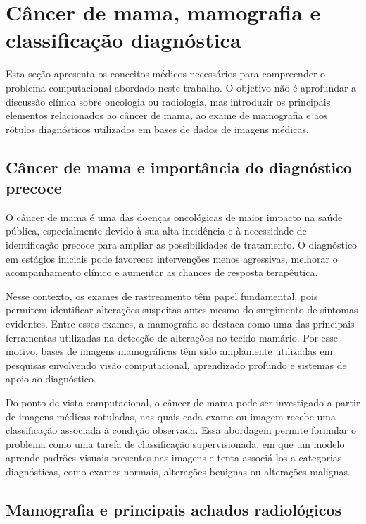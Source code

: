 \documentclass[
    12pt,
    openright,
    oneside,
    a4paper,
    english,
    brazil
]{abntex2}
\begin{document}
\section{Câncer de mama, mamografia e classificação diagnóstica}

Esta seção apresenta os conceitos médicos necessários para compreender o problema computacional abordado neste trabalho. O objetivo não é aprofundar a discussão clínica sobre oncologia ou radiologia, mas introduzir os principais elementos relacionados ao câncer de mama, ao exame de mamografia e aos rótulos diagnósticos utilizados em bases de dados de imagens médicas.

\subsection{Câncer de mama e importância do diagnóstico precoce}

O câncer de mama é uma das doenças oncológicas de maior impacto na saúde pública, especialmente devido à sua alta incidência e à necessidade de identificação precoce para ampliar as possibilidades de tratamento. O diagnóstico em estágios iniciais pode favorecer intervenções menos agressivas, melhorar o acompanhamento clínico e aumentar as chances de resposta terapêutica.

Nesse contexto, os exames de rastreamento têm papel fundamental, pois permitem identificar alterações suspeitas antes mesmo do surgimento de sintomas evidentes. Entre esses exames, a mamografia se destaca como uma das principais ferramentas utilizadas na detecção de alterações no tecido mamário. Por esse motivo, bases de imagens mamográficas têm sido amplamente utilizadas em pesquisas envolvendo visão computacional, aprendizado profundo e sistemas de apoio ao diagnóstico.

Do ponto de vista computacional, o câncer de mama pode ser investigado a partir de imagens médicas rotuladas, nas quais cada exame ou imagem recebe uma classificação associada à condição observada. Essa abordagem permite formular o problema como uma tarefa de classificação supervisionada, em que um modelo aprende padrões visuais presentes nas imagens e tenta associá-los a categorias diagnósticas, como exames normais, alterações benignas ou alterações malignas.

\subsection{Mamografia e principais achados radiológicos}
\end{document}
